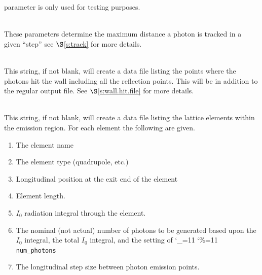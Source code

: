 \documentclass[11pt,openany]{report}
\newcommand{\sref}[1]{$\S$\ref{#1}}
\newcommand\ttcmd{\begingroup\catcode`\_=11 \catcode`\%=11 \dottcmd}
\newcommand\dottcmd[1]{\texttt{#1}\endgroup}
\newcommand{\vn}{\ttcmd}
\newcommand{\Newline}{\hfil \\}
\begin{document}
\begin{description}
parameter is only used for testing purposes.
  \item[\vn{sr3d_params\%ds_track_step_max}, \vn{sr3d_params\%dr_track_step_max}] \Newline
These parameters determine the maximum distance a photon is tracked in
a given ``step'' see \sref{s:track} for more details.
  \item[\vn{wall_hit_file}] \Newline
This string, if not blank, will create a data file listing the points
where the photons hit the wall including all the reflection
points. This will be in addition to the regular output file.  See
\sref{s:wall.hit.file} for more details.
  \item[\vn{lat_ele_file}] \Newline
This string, if not blank, will create a data file listing  the lattice
elements within the emission region. For each element the following are given. 
  \begin{enumerate}
  \item
    The element name
  \item
    The element type (quadrupole, etc.)
  \item
    Longitudinal position at the exit end of the element
  \item
    Element length.
  \item
    $I_0$ radiation integral through the element.
  \item
    The nominal (not actual) number of photons to be generated based upon the $I_0$ integral,
    the total $I_0$ integral, and the setting of \vn{num_photons}
  \item
    The longitudinal step size between photon emission points.
  \end{enumerate}


\end{description}
\end{document}

